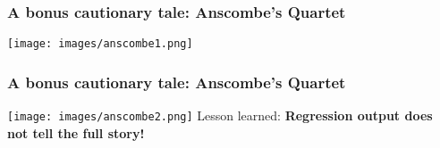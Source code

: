 \documentclass[11pt]{beamer}
\begin{document}
\begin{frame}
\frametitle{A bonus cautionary tale: Anscombe's Quartet}
\begin{center}
	\texttt{[image: images/anscombe1.png]}
\end{center}
\end{frame}

\begin{frame}
\frametitle{A bonus cautionary tale: Anscombe's Quartet}
\begin{center}
	\texttt{[image: images/anscombe2.png]}
	Lesson learned: \textbf{Regression output does not tell the full story!} \\ \medskip
\end{center}
\end{frame}
\end{document}
